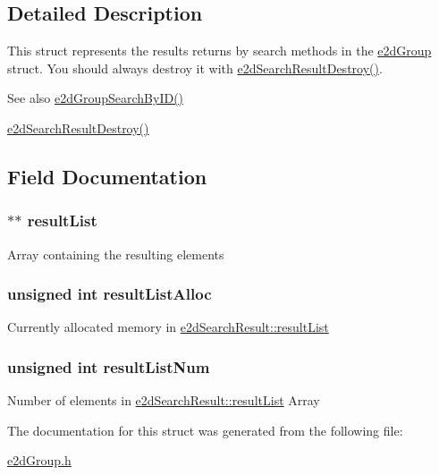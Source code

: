 \subsection{Detailed Description}
This struct represents the results returns by search methods in the \hyperlink{structe2dGroup}{e2d\-Group} struct. You should always destroy it with \hyperlink{group__e2dGroup_ga0775c9a7e2ec5311263f84339afb52bc}{e2d\-Search\-Result\-Destroy()}. 

\begin{DoxySeeAlso}{See also}
\hyperlink{group__e2dGroup_ga0c495948b5e2e14d004d1daacf4811af}{e2d\-Group\-Search\-By\-I\-D()} 

\hyperlink{group__e2dGroup_ga0775c9a7e2ec5311263f84339afb52bc}{e2d\-Search\-Result\-Destroy()} 
\end{DoxySeeAlso}


\subsection{Field Documentation}
\hypertarget{structe2dSearchResult_acb54f0ae39cc6710460aa41f5f0afd9f}{
\subsubsection[{result\-List}]{$\ast$$\ast$ {\bf result\-List}}}\label{structe2dSearchResult_acb54f0ae39cc6710460aa41f5f0afd9f}
Array containing the resulting elements \hypertarget{structe2dSearchResult_a0b7370bba258bd87e0d7ae10af711d34}{
\subsubsection[{result\-List\-Alloc}]{\setlength{\rightskip}{0pt plus 5cm}unsigned int {\bf result\-List\-Alloc}}}\label{structe2dSearchResult_a0b7370bba258bd87e0d7ae10af711d34}
Currently allocated memory in \hyperlink{structe2dSearchResult_acb54f0ae39cc6710460aa41f5f0afd9f}{e2d\-Search\-Result\-::result\-List} \hypertarget{structe2dSearchResult_a65874957dc9197a16158b3807acb5d1e}{
\subsubsection[{result\-List\-Num}]{\setlength{\rightskip}{0pt plus 5cm}unsigned int {\bf result\-List\-Num}}}\label{structe2dSearchResult_a65874957dc9197a16158b3807acb5d1e}
Number of elements in \hyperlink{structe2dSearchResult_acb54f0ae39cc6710460aa41f5f0afd9f}{e2d\-Search\-Result\-::result\-List} Array 

The documentation for this struct was generated from the following file\-:\begin{DoxyCompactItemize}
\item 
\hyperlink{e2dGroup_8h}{e2d\-Group.\-h}\end{DoxyCompactItemize}
